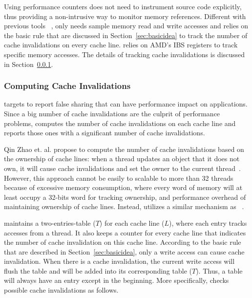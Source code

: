 Using performance counters does not need to instrument source code explicitly, thus providing a non-intrusive way to monitor memory references. 
Different with previous tools ~\cite{mldetect, openmp, detect:ptu}, \cheetah{} only needs sample memory read and write accesses and relies on the basic rule that are discussed in Section~\ref{sec:basicidea} to track the number of cache invalidations on every cache line. \Cheetah{} relies on AMD's IBS registers to track specific memory accesses. The details of tracking cache invalidations is discussed in Section~\ref{sec:computeinvalidations}. 

\subsubsection{Computing Cache Invalidations}
\label{sec:computeinvalidations}

\Cheetah{} targets to report false sharing that can have performance impact on applications. Since a big number of cache invalidations are the culprit of performance problems, \Cheetah{}  computes the number of cache invalidations on each cache line and reports those ones with a significant number of cache invalidations.  

Qin Zhao et. al. propose to compute the number of cache invalidations based on the ownership of cache lines: when a thread updates an object that it does not own, it will cause cache invalidations and set the owner to the current thread~\cite{qinzhao}. However, this approach cannot be easily to scalable to more than 32 threads because of excessive memory consumption, where every word of memory will at least occupy a 32-bits word for tracking ownership, and performance overhead of maintaining ownership of cache lines. Instead, \Cheetah{} utilizes a similar mechanism as \Predator{}~\cite{Predator}. 

\cheetah{} maintains a two-entries-table ($T$) for each cache line ($L$), where each entry tracks accesses from a thread. It also keeps a counter for every cache line that indicates the number of cache invalidation on this cache line.  
According to the basic rule that are described in Section~\ref{sec:basicidea}, only a write access can cause cache invalidation. When there is a cache invalidation, the current write access will flush the table and will be added into its corresponding table ($T$). Thus, a table will always have an entry except in the beginning. More specifically, \cheetah{} checks possible cache invalidations as follows.
 
